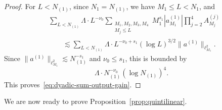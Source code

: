 \documentclass[11pt,reqno,english]{amsart}
\numberwithin{equation}{section}
\theoremstyle{plain}
\theoremstyle{definition}
\theoremstyle{remark}
\begin{document}
\begin{proof}
	For $L<N_{(1)}$, since $N_1=N_{(1)}$, we have $M_1\leq L<N_1$, and
	\begin{align*}
		&\sum_{L<N_{(1)}}\Lambda\cdot L^{-\nu_0}\sum_{\substack{M_1,M_2,M_3,M_4\\ M_j\leq L}}M_1^{s_1}|a_{M_1}^{(1)}|\prod_{j=2}^4 A_{M_j}^{(j)}\\
		&\qquad\lesssim \sum_{L<N_{(1)}}\Lambda \cdot L^{-\nu_0+s_1}(\log L)^{3/2}\|a^{(1)}\|_{\ell_{M_1}^2}.
	\end{align*}
	Since $\|a^{(1)}\|_{\ell_{M_1}^2}\lesssim N_{(1)}^{-s_1}$ and $\nu_0\leq s_1$, this is bounded by
	\[
	\Lambda\cdot N_{(1)}^{-\nu_0}(\log N_{(1)})^4.
	\]
	This proves~\eqref{eq:dyadic-sum-output-gain}.
\end{proof}




We are now ready to prove Proposition~\ref{prop:quintilinear}.
\end{document}
